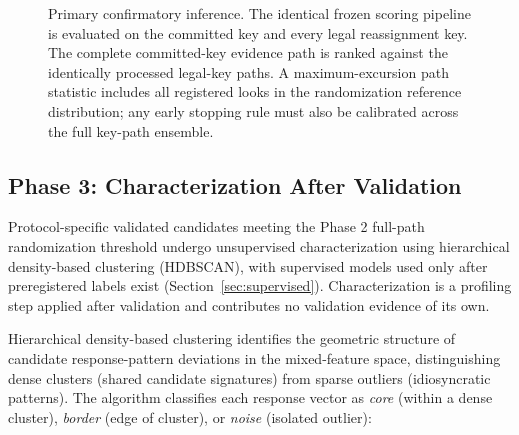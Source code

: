 \documentclass[11pt,letterpaper]{article}
\begin{document}
\begin{figure}[htbp]
\centering
{}
\caption{Primary confirmatory inference. The identical frozen scoring pipeline is evaluated on the committed key and every legal reassignment key. The complete committed-key evidence path is ranked against the identically processed legal-key paths. A maximum-excursion path statistic includes all registered looks in the randomization reference distribution; any early stopping rule must also be calibrated across the full key-path ensemble.}
\label{fig:sequential}
\end{figure}

\subsection{Phase 3: Characterization After Validation}
\label{sec:phase3}

Protocol-specific validated candidates meeting the Phase 2 full-path randomization threshold undergo unsupervised characterization using hierarchical density-based clustering (HDBSCAN), with supervised models used only after preregistered labels exist (Section~\ref{sec:supervised}). Characterization is a profiling step applied after validation and contributes no validation evidence of its own.

Hierarchical density-based clustering identifies the geometric structure of candidate response-pattern deviations in the mixed-feature space, distinguishing dense clusters (shared candidate signatures) from sparse outliers (idiosyncratic patterns). The algorithm classifies each response vector as \textit{core} (within a dense cluster), \textit{border} (edge of cluster), or \textit{noise} (isolated outlier):
\end{document}

